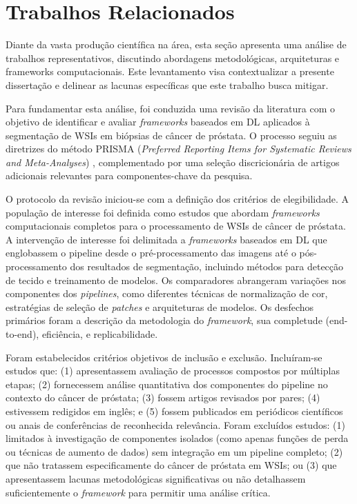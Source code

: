 \section{Trabalhos Relacionados}\label{sec:trabalhos_relacionados}

Diante da vasta produção científica na área, esta seção apresenta uma análise de trabalhos representativos, discutindo abordagens metodológicas, arquiteturas e frameworks computacionais. Este levantamento visa contextualizar a presente dissertação e delinear as lacunas específicas que este trabalho busca mitigar.

Para fundamentar esta análise, foi conduzida uma revisão da literatura com o objetivo de identificar e avaliar \textit{frameworks} baseados em DL aplicados à segmentação de WSIs em biópsias de câncer de próstata. O processo seguiu as diretrizes do método PRISMA (\textit{Preferred Reporting Items for Systematic Reviews and Meta-Analyses}) \cite{Moher2009}, complementado por uma seleção discricionária de artigos adicionais relevantes para componentes-chave da pesquisa.

O protocolo da revisão iniciou-se com a definição dos critérios de elegibilidade. A população de interesse foi definida como estudos que abordam \textit{frameworks} computacionais completos para o processamento de WSIs de câncer de próstata. A intervenção de interesse foi delimitada a \textit{frameworks} baseados em DL que englobassem o pipeline desde o pré-processamento das imagens até o pós-processamento dos resultados de segmentação, incluindo métodos para detecção de tecido e treinamento de modelos. Os comparadores abrangeram variações nos componentes dos \textit{pipelines}, como diferentes técnicas de normalização de cor, estratégias de seleção de \textit{patches} e arquiteturas de modelos. Os desfechos primários foram a descrição da metodologia do \textit{framework}, sua completude (end-to-end), eficiência, e replicabilidade.

Foram estabelecidos critérios objetivos de inclusão e exclusão. Incluíram-se estudos que: (1) apresentassem avaliação de processos compostos por múltiplas etapas; (2) fornecessem análise quantitativa dos componentes do pipeline no contexto do câncer de próstata; (3) fossem artigos revisados por pares; (4) estivessem redigidos em inglês; e (5) fossem publicados em periódicos científicos ou anais de conferências de reconhecida relevância. Foram excluídos estudos: (1) limitados à investigação de componentes isolados (como apenas funções de perda ou técnicas de aumento de dados) sem integração em um pipeline completo; (2) que não tratassem especificamente do câncer de próstata em WSIs; ou (3) que apresentassem lacunas metodológicas significativas ou não detalhassem suficientemente o \textit{framework} para permitir uma análise crítica.

